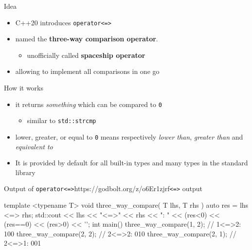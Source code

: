 \begin{frame}[fragile]
  \begin{block}{Idea}
    \begin{itemize}
    \item C++20 introduces \texttt{operator<=>}
    \item named the \textbf{three-way comparison operator}.
      \begin{itemize}
      \item unofficially called \textbf{spaceship operator}
      \end{itemize}
    \item allowing to implement all comparisons in one go
    \end{itemize}
  \end{block}
  \begin{exampleblock}{How it works}
    \begin{itemize}
    \item it returns \emph{something} which can be compared to \texttt{0}
      \begin{itemize}
      \item similar to \texttt{std::strcmp}
      \end{itemize}
    \item lower, greater, or equal to \texttt{0} means respectively \emph{lower than}, \emph{greater than} and \emph{equivalent to}
    \item It is provided by default for all built-in types and many types in the standard library
    \end{itemize}
  \end{exampleblock}
\end{frame}

\begin{frame}[fragile]
  \begin{exampleblockGB}{Output of \texttt{operator<=>}}{https://godbolt.org/z/o6Er1zjrf}{\texttt{<=>} output}
    \begin{cppcode*}{}
    template <typename T>
    void three_way_compare( T lhs, T rhs ) {
      auto res = lhs <=> rhs;
      std::cout << lhs << "<=>" << rhs << ": "
                << (res<0) << (res==0) << (res>0)
                << '\n';
    }
    int main() {
      three_way_compare(1, 2); // 1<=>2: 100
      three_way_compare(2, 2); // 2<=>2: 010
      three_way_compare(2, 1); // 2<=>1: 001
    }
    \end{cppcode*}
  \end{exampleblockGB}
\end{frame}

